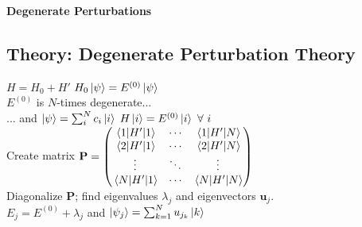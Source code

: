 \documentclass[11pt, a4paper]{article}
\newcommand{\newsec}[1]{\vspace{2mm}\textbf{#1}\\}
\renewcommand{\vec}[1]{\bm{#1}} %
\newcommand{\mat}[1]{\mathbf{#1}} %
\begin{document}
\begin{multicols}{2}
\newsec{Degenerate Perturbations}

\subsection{Theory: Degenerate Perturbation Theory}
$ H = H_{0} + H' $ \qquad $ H_{0} \ket{\psi}  = E^{(0)} \ket{\psi} $\\
$ E^{(0)} $ is $ N $-times degenerate...\\[0.2em]
\null \quad ... and $ \ket{\psi} = \sum_{i}^{N}c_{i}\ket{i} $ \qquad $ H\ket{i} = E^{(0)} \ket{i} \ \forall \ i $\\
Create matrix
$ \mat{P} = 
\begin{pmatrix}
	\mel{1}{H'}{1} &  \cdots & \mel{1}{H'}{N} \\
	\mel{2}{H'}{1} & \cdots & \mel{2}{H'}{N} \\
	\vdots & \ddots & \vdots\\
	\mel{N}{H'}{1} &  \cdots & \mel{N}{H'}{N} 
\end{pmatrix} $\\
Diagonalize $ \mat{P} $; find eigenvalues $ \lambda_{j} $ and eigenvectors $ \vec{u}_{j} $.\\
$ E_{j} = E^{(0)} + \lambda_{j}  $ \qquad and \qquad $ \ket{\psi_{j}} = \sum_{k=1}^{N}u_{j_{k}} \ket{k} $


\end{multicols}
\end{document}
